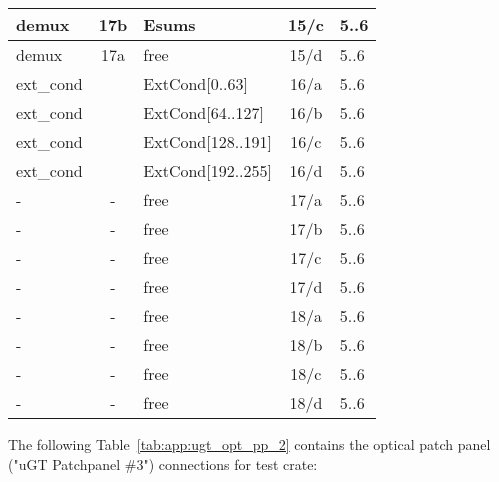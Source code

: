 \begin{longtable}{|l|c|l|c|l|}
demux & 17b & Esums      & 15/c & 5..6 \\\hline
demux & 17a & free      & 15/d & 5..6 \\\hline
ext\_cond &     & ExtCond[0..63]    & 16/a & 5..6 \\\hline
ext\_cond &     & ExtCond[64..127]  & 16/b & 5..6 \\\hline
ext\_cond &     & ExtCond[128..191] & 16/c & 5..6 \\\hline
ext\_cond &     & ExtCond[192..255] & 16/d & 5..6 \\\hline
- & - & free & 17/a & 5..6 \\\hline
- & - & free & 17/b & 5..6 \\\hline
- & - & free & 17/c & 5..6 \\\hline
- & - & free & 17/d & 5..6 \\\hline
- & - & free & 18/a & 5..6 \\\hline
- & - & free & 18/b & 5..6 \\\hline
- & - & free & 18/c & 5..6 \\\hline
- & - & free & 18/d & 5..6 \\\hline
\end{longtable}

The following Table~\ref{tab:app:ugt_opt_pp_2} contains the optical patch panel ("uGT Patchpanel \#3") connections for test crate:

